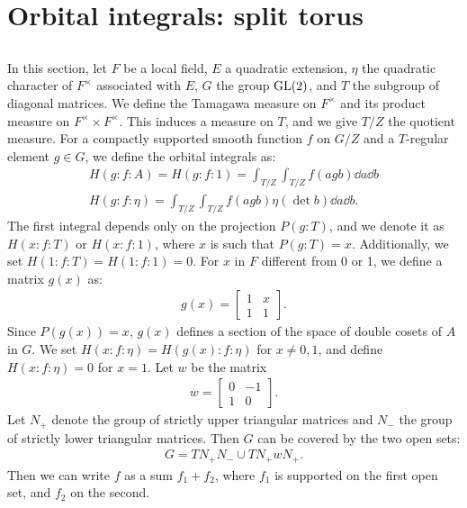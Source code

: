 \section{Orbital integrals: split torus}

\subsection{}
In this section, let $F$ be a local field, $E$ a quadratic extension, $\eta$ the quadratic character of $F^\times$ associated with $E$, $G$ the group $\mathrm{GL}(2)$, and $T$ the subgroup of diagonal matrices.
We define the Tamagawa measure on $F^\times$ and its product measure on $F^\times \times F^\times$.
This induces a measure on $T$, and we give $T/Z$ the quotient measure.
For a compactly supported smooth function $f$ on $G/Z$ and a $T$-regular element $g \in G$, we define the orbital integrals as:
\begin{align}
    H(g:f:A) = H(g:f:1) = \int_{T/Z} \int_{T/Z} f(agb) \dd a \dd b \\
    H(g:f:\eta) = \int_{T/Z} \int_{T/Z} f(agb) \eta(\det b) \dd a \dd b.
\end{align}
The first integral depends only on the projection $P(g:T)$, and we denote it as $H(x:f:T)$ or $H(x:f:1)$, where $x$ is such that $P(g:T) = x$.
Additionally, we set $H(1:f:T) = H(1:f:1) = 0$.
For $x$ in $F$ different from 0 or 1, we define a matrix $g(x)$ as:
\begin{align}
    g(x) = \begin{bmatrix}
    1 & x \\ 1 & 1
    \end{bmatrix}.
\end{align}
Since $P(g(x)) = x$, $g(x)$ defines a section of the space of double cosets of $A$ in $G$.
We set $H(x:f:\eta) = H(g(x):f:\eta)$ for $x \neq 0, 1$, and define $H(x:f:\eta) = 0$ for $x = 1$.
Let $w$ be the matrix
\begin{align}
    w = \begin{bmatrix}
        0 & -1 \\ 1 & 0        
    \end{bmatrix}.
\end{align}
Let $N_+$ denote the group of strictly upper triangular matrices and $N_-$ the group of strictly lower triangular matrices.
Then $G$ can be covered by the two open sets:
\begin{align}
\label{3.1.5}
    G = TN_{+}N_{-} \cup TN_{+}wN_{+}.
\end{align}
Then we can write $f$ as a sum $f_1 + f_2$, where $f_1$ is supported on the first open set, and $f_2$ on the second.
